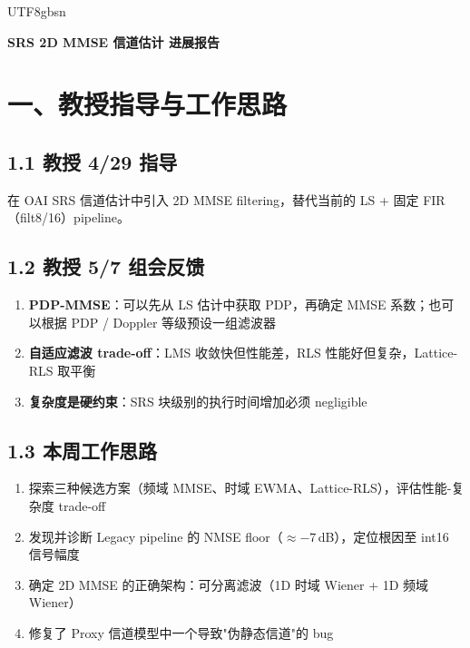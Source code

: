 \documentclass[11pt,a4paper]{article}
\begin{document}
\begin{CJK}{UTF8}{gbsn}

\begin{center}
{\LARGE\bfseries SRS 2D MMSE 信道估计 进展报告}\\[0.8em]
{}
\end{center}

\vspace{1em}

\section{一、教授指导与工作思路}

\subsection{1.1 教授 4/29 指导}

在 OAI SRS 信道估计中引入 2D MMSE filtering，替代当前的 LS + 固定 FIR（filt8/16）pipeline。

\subsection{1.2 教授 5/7 组会反馈}

\begin{enumerate}[leftmargin=2em]
\item \textbf{PDP-MMSE}：可以先从 LS 估计中获取 PDP，再确定 MMSE 系数；也可以根据 PDP / Doppler 等级预设一组滤波器
\item \textbf{自适应滤波 trade-off}：LMS 收敛快但性能差，RLS 性能好但复杂，Lattice-RLS 取平衡
\item \textbf{复杂度是硬约束}：SRS 块级别的执行时间增加必须 negligible
\end{enumerate}

\subsection{1.3 本周工作思路}

\begin{enumerate}[leftmargin=2em]
\item 探索三种候选方案（频域 MMSE、时域 EWMA、Lattice-RLS），评估性能-复杂度 trade-off
\item 发现并诊断 Legacy pipeline 的 NMSE floor（$\approx -7$\,dB），定位根因至 int16 信号幅度
\item 确定 2D MMSE 的正确架构：可分离滤波（1D 时域 Wiener + 1D 频域 Wiener）
\item 修复了 Proxy 信道模型中一个导致"伪静态信道"的 bug
\end{enumerate}


\end{CJK}
\end{document}
